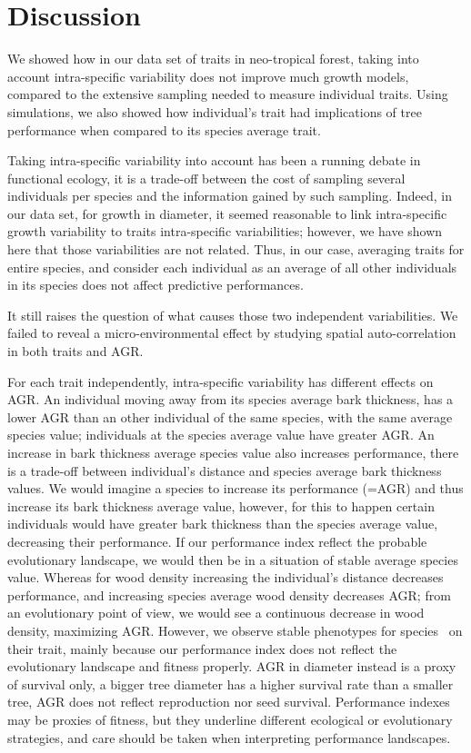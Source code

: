 \label{sec:Disc}
\section*{Discussion}

We showed how in our data set of traits in neo-tropical forest, taking into account intra-specific variability does not improve much growth models, compared to the extensive sampling needed to measure individual traits. Using simulations, we also showed how individual's trait had implications of tree performance when compared to its species average trait.

Taking intra-specific variability into account has been a running debate in functional ecology, it is a trade-off between the cost of sampling several individuals per species and the information gained by such sampling. Indeed, in our data set, for growth in diameter, it seemed reasonable to link intra-specific growth variability to traits intra-specific variabilities; however, we have shown here that those variabilities are not related. Thus, in our case, averaging traits for entire species, and consider each individual as an average of all other individuals in its species does not affect predictive performances.

It still raises the question of what causes those two independent variabilities. We failed to reveal a micro-environmental effect by studying spatial auto-correlation in both traits and AGR.

For each trait independently, intra-specific variability has different effects on AGR. An individual moving away from its species average bark thickness, has a lower AGR than an other individual of the same species, with the same average species value; individuals at the species average value have greater AGR. An increase in bark thickness average species value also increases performance, there is a trade-off between individual's distance and species average bark thickness values. We would imagine a species to increase its performance (=AGR) and thus increase its bark thickness average value, however, for this to happen certain individuals would have greater bark thickness than the species average value, decreasing their performance. If our performance index reflect the probable evolutionary landscape, we would then be in a situation of stable average species value. Whereas for wood density increasing the individual's distance decreases performance, and increasing species average wood density decreases AGR; from an evolutionary point of view, we would see a continuous decrease in wood density, maximizing AGR. However, we observe stable phenotypes for species~\cite{NEEDED} on their trait, mainly because our performance index does not reflect the evolutionary landscape and fitness properly. AGR in diameter instead is a proxy of survival only, a bigger tree diameter has a higher survival rate than a smaller tree, AGR does not reflect reproduction nor seed survival. Performance indexes may be proxies of fitness, but they underline different ecological or evolutionary strategies, and care should be taken when interpreting performance landscapes.

